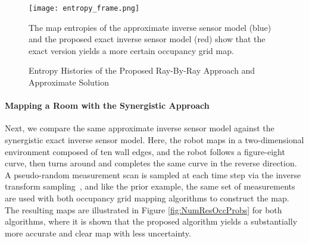 \begin{figure}
  \centering
  \texttt{[image: entropy\_frame.png]}
  \caption{Entropy Histories of the Proposed Ray-By-Ray Approach and Approximate Solution}
  	\medskip
	\small
	The map entropies of the approximate inverse sensor model (blue) and the proposed exact inverse sensor model (red) show that the exact version yields a more certain occupancy grid map.
\label{fig:entropy}
\end{figure}



\paragraph{Mapping a Room with the Synergistic Approach}

Next, we compare the same approximate inverse sensor model against the synergistic exact inverse sensor model.
Here, the robot maps in a two-dimensional environment composed of ten wall edges, and the robot follows a figure-eight curve, then turns around and completes the same curve in the reverse direction. A pseudo-random measurement scan is sampled at each time step via the inverse transform sampling~\cite{DevBK86}, and like the prior example, the same set of measurements are used with both occupancy grid mapping algorithms to construct the map.
The resulting maps are illustrated in Figure \ref{fig:NumResOccProbs} for both algorithms, where it is shown that the proposed algorithm yields a substantially more accurate and clear map with less uncertainty. 


